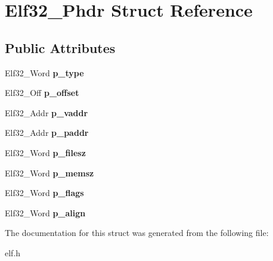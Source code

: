 \hypertarget{struct_elf32___phdr}{}\section{Elf32\+\_\+\+Phdr Struct Reference}
\label{struct_elf32___phdr}
\subsection*{Public Attributes}
\begin{DoxyCompactItemize}
\item 
\mbox{\label{struct_elf32___phdr_a8b1d2942ddb9abcb85db1429b5116923}} 
Elf32\+\_\+\+Word {\bfseries p\+\_\+type}
\item 
\mbox{\label{struct_elf32___phdr_ac590d4c4b26104216e53058b5b03eef0}} 
Elf32\+\_\+\+Off {\bfseries p\+\_\+offset}
\item 
\mbox{\label{struct_elf32___phdr_a01a298ebc899bcf9c23211a7bf1155a6}} 
Elf32\+\_\+\+Addr {\bfseries p\+\_\+vaddr}
\item 
\mbox{\label{struct_elf32___phdr_af18f0a179a5fca09e3c04bcdce3fac2f}} 
Elf32\+\_\+\+Addr {\bfseries p\+\_\+paddr}
\item 
\mbox{\label{struct_elf32___phdr_ac9151f2e11001284bf1c7d2d2659555c}} 
Elf32\+\_\+\+Word {\bfseries p\+\_\+filesz}
\item 
\mbox{\label{struct_elf32___phdr_ada1cdd3d6ccb79a17bed0e3c21379c84}} 
Elf32\+\_\+\+Word {\bfseries p\+\_\+memsz}
\item 
\mbox{\label{struct_elf32___phdr_a35c457e6828894b7b275730593802050}} 
Elf32\+\_\+\+Word {\bfseries p\+\_\+flags}
\item 
\mbox{\label{struct_elf32___phdr_afd09d9e4297b13fc94fd57d09f2a9f70}} 
Elf32\+\_\+\+Word {\bfseries p\+\_\+align}
\end{DoxyCompactItemize}


The documentation for this struct was generated from the following file\+:\begin{DoxyCompactItemize}
\item 
elf.\+h\end{DoxyCompactItemize}
